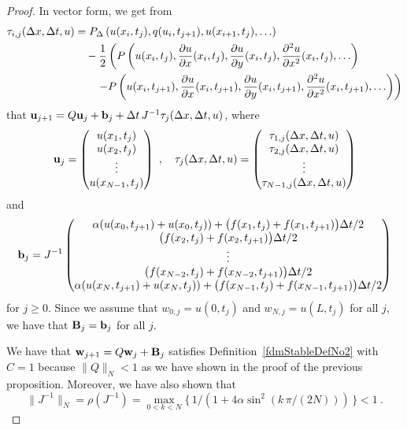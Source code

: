 \begin{proof}
In vector form, we get from
\begin{align*}
\tau_{i,j}(\Delta{x},\Delta{t},u)
&=  P_\Delta\left(u(x_i,t_j), q(u_i,t_{j+1}),
u(x_{i+1},t_j), \ldots\right) \\ 
&\quad - \frac{1}{2} \left(
P\left(u(x_i,t_j), \frac{\partial{u}}{\partial{x}}(x_i,t_j), \frac{\partial{u}}{\partial{y}}(x_i,t_j),
\frac{\partial^{2}{u}}{\partial{x}^{2}}(x_i,t_j), \ldots \right) \right. \\
&\qquad \left. - P\left(u(x_i,t_{j+1}), \frac{\partial{u}}{\partial{x}}(x_i,t_{j+1}),
\frac{\partial{u}}{\partial{y}}(x_i,t_{j+1}), \frac{\partial^{2}{u}}{\partial{x}^{2}}(x_i,t_{j+1}), \ldots \right)
\right)
\end{align*}
that
$\mathbf{u}_{j+1} = Q \mathbf{u}_j + \mathbf{b}_j
+ \Delta{t}\, J^{-1} \mathbf{\tau}_j(\Delta{x},\Delta{t},u)$, where
\[
\mathbf{u}_j = \begin{pmatrix}
u(x_1,t_j) \\ u(x_2,t_j) \\ \vdots \\ u(x_{N-1},t_j)
\end{pmatrix}
\ , \quad 
\mathbf{\tau}_j(\Delta{x},\Delta{t},u)
= \begin{pmatrix}
\tau_{1,j}(\Delta{x},\Delta{t},u) \\ \tau_{2,j}(\Delta{x},\Delta{t},u) \\
\vdots \\ \tau_{N-1,j}(\Delta{x},\Delta{t},u) 
\end{pmatrix}
\]
and
\[
\mathbf{b}_j = J^{-1} \begin{pmatrix}
\alpha (u(x_0,t_{j+1}) + u(x_0,t_j))
+ \big( f(x_1,t_j) + f(x_1,t_{j+1})\big)\Delta{t}/2 \\
\big( f(x_2,t_j)  + f(x_2,t_{j+1})\big)\Delta{t}/2 \\
\vdots \\
\big( f(x_{N-2},t_j) + f(x_{N-2},t_{j+1})\big)\Delta{t}/2 \\
\alpha ( u(x_N,t_{j+1}) + u(x_N,t_j))
+ \big( f(x_{N-1},t_j) + f(x_{N-1},t_{j+1})\big)\Delta{t}/2
\end{pmatrix}
\]
for $j\geq 0$.  Since we assume that $w_{0,j} = u(0,t_j)$ and
$w_{N,j} = u(L,t_j)$ for all $j$, we have that $\mathbf{B}_j = \mathbf{b}_j$
for all $j$.

We have that $\mathbf{w}_{j+1} = Q\mathbf{w}_j + \mathbf{B}_j$ satisfies
Definition~\ref{fdmStableDefNo2} with $C=1$ because $\|Q\|_N < 1$ as
we have shown in the proof of the previous proposition.  Moreover, we
have also shown that
\[
\|J^{-1}\|_N = \rho(J^{-1}) = \max_{0<k<N}
\{\, 1/(1 + 4 \alpha \sin^2\left(k\,\pi/(2N)\right)) \, \} < 1 \ .
\]


\end{proof}
